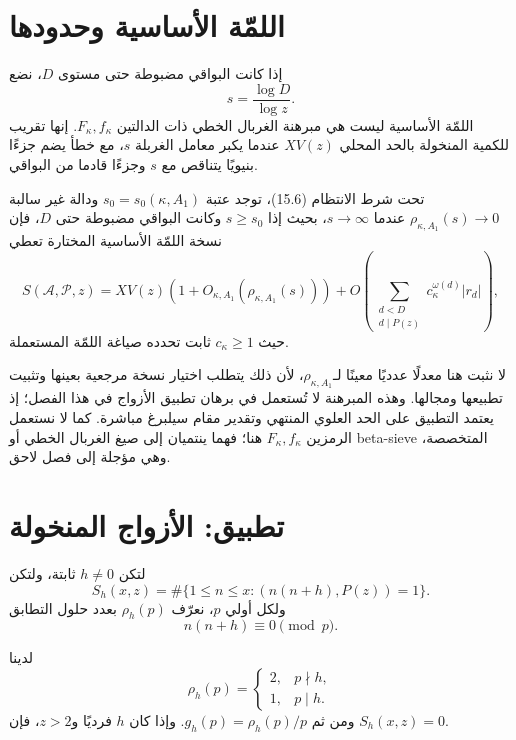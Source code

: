 \section{اللمّة الأساسية وحدودها}

إذا كانت البواقي مضبوطة حتى مستوى \(D\)، نضع
\[
s=\frac{\log D}{\log z}.
\tag{15.8}
\]
اللمّة الأساسية ليست هي مبرهنة الغربال الخطي ذات الدالتين
\(F_\kappa,f_\kappa\). إنها تقريب للكمية المنخولة بالحد المحلي \(XV(z)\) عندما
يكبر معامل الغربلة \(s\)، مع خطأ يضم جزءًا بنيويًا يتناقص مع \(s\) وجزءًا
قادما من البواقي.

\begin{theorem}
\label{thm:chapter15-fundamental-lemma}
تحت شرط الانتظام (15.6)، توجد عتبة
\(s_0=s_0(\kappa,A_1)\) ودالة غير سالبة
\(\rho_{\kappa,A_1}(s)\to0\) عندما \(s\to\infty\)، بحيث إذا
\(s\ge s_0\) وكانت البواقي مضبوطة حتى \(D\)، فإن نسخة اللمّة الأساسية المختارة
تعطي
\[
S(\mathcal A,\mathcal P,z)
=
XV(z)
\left(1+O_{\kappa,A_1}(\rho_{\kappa,A_1}(s))\right)
+
O\!\left(
\sum_{\substack{d<D\\d\mid P(z)}}
 c_\kappa^{\omega(d)}|r_d|
\right),
\tag{15.9}
\]
حيث \(c_\kappa\ge1\) ثابت تحدده صياغة اللمّة المستعملة.
\end{theorem}
لا نثبت هنا معدلًا عدديًا معينًا لـ\(\rho_{\kappa,A_1}\)، لأن ذلك يتطلب اختيار
نسخة مرجعية بعينها وتثبيت تطبيعها ومجالها. وهذه المبرهنة لا تُستعمل في برهان
تطبيق الأزواج في هذا الفصل؛ إذ يعتمد التطبيق على الحد العلوي المنتهي وتقدير
مقام سيلبرغ مباشرة. كما لا نستعمل الرمزين
\(F_\kappa,f_\kappa\) هنا؛ فهما ينتميان إلى صيغ الغربال الخطي أو
\textenglish{beta-sieve} المتخصصة، وهي مؤجلة إلى فصل لاحق.
\section{تطبيق: الأزواج المنخولة}

لتكن \(h\ne0\) ثابتة، ولتكن
\[
S_h(x,z)
=
\#\{1\le n\le x:(n(n+h),P(z))=1\}.
\tag{15.10}
\]
ولكل أولي \(p\)، نعرّف \(\rho_h(p)\) بعدد حلول التطابق
\[
n(n+h)\equiv0\pmod p.
\]

\begin{proposition}
\label{prop:chapter15-pair-local-density}
\provedhere
لدينا
\[
\rho_h(p)=
\begin{cases}
2,&p\nmid h,\\
1,&p\mid h.
\end{cases}
\tag{15.11}
\]
ومن ثم \(g_h(p)=\rho_h(p)/p\). وإذا كان \(h\) فرديًا و\(z>2\)، فإن
\(S_h(x,z)=0\).
\end{proposition}


